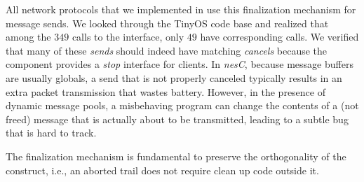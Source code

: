 All network protocols that we implemented in \CEU use this finalization 
mechanism for message sends.
%
We looked through the TinyOS code base and realized that among the $349$ calls 
to the  interface, only $49$ have corresponding 
 calls.
We verified that many of these \emph{sends} should indeed have matching 
\emph{cancels} because the component provides a \emph{stop} interface for 
clients.
In \emph{nesC}, because message buffers are usually globals, a send that is not 
properly canceled typically results in an extra packet transmission that 
wastes battery.
However, in the presence of dynamic message pools, a misbehaving program can 
change the contents of a (not freed) message that is actually about to be 
transmitted, leading to a subtle bug that is hard to track.



The finalization mechanism is fundamental to preserve the orthogonality of the
 construct, i.e., an aborted trail does not require clean up code 
outside it.

